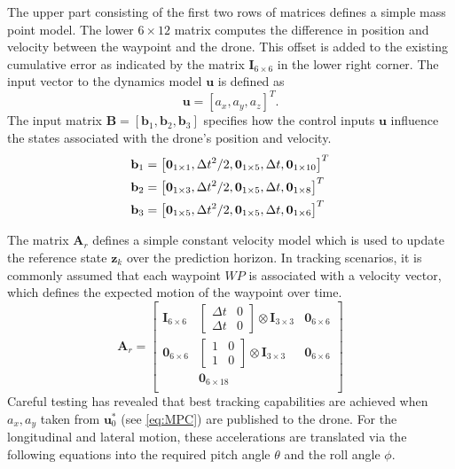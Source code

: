 The upper part consisting of the first two rows of matrices defines a simple mass point model. The lower $6\times12$ matrix computes the difference in position and velocity between the waypoint and the drone. This offset is added to the existing cumulative error as indicated by the matrix $\mathbf{I}_{6\times6}$ in the lower right corner. 
The input vector to the dynamics model $\mathbf{u}$  is defined as
\begin{dmath}
\mathbf{u} = \left[a_x,a_y,a_z\right]^T.
\end{dmath}
The input matrix $\mathbf{B} = \left[ \mathbf{b}_1,\mathbf{b}_2, \mathbf{b}_3 \right]$  specifies how the control inputs $\mathbf{u}$ influence the states associated with the drone's position and velocity.
\begin{align}
\mathbf{b}_1 & = \left[\mathbf{0}_{1\times1},\Delta t^2/2 , \mathbf{0}_{1\times5},\Delta t ,\mathbf{0}_{1\times10} \right]^T \notag   \\ 
\mathbf{b}_2 & = \left[\mathbf{0}_{1\times3},\Delta t^2/2 , \mathbf{0}_{1\times5},\Delta t ,\mathbf{0}_{1\times8} \right]^T\\
\mathbf{b}_3 & = \left[\mathbf{0}_{1\times5},\Delta t^2/2 , \mathbf{0}_{1\times5},\Delta t ,\mathbf{0}_{1\times6} \right]^T  \notag
\end{align}

The matrix $\mathbf{A}_{r}$ defines a simple constant velocity model which is used to update the reference state $\mathbf{z}_{k}$ over the prediction horizon. In tracking scenarios, it is commonly assumed that each waypoint $WP$ is associated with a velocity vector, which defines the expected motion of the waypoint over time.
\begin{equation}
\mathbf{A}_{r} =
\begin{bmatrix}
\mathbf{I}_{6\times6} & \begin{bmatrix} \Delta t & 0 \\ \Delta t & 0\end{bmatrix} \otimes \mathbf{I}_{3\times3} & \mathbf{0}_{6\times6} \\ 
\mathbf{0}_{6\times6} & \begin{bmatrix} 1 & 0 \\ 1 & 0\end{bmatrix} \otimes \mathbf{I}_{3\times3} & \mathbf{0}_{6\times6} \\ 
&\mathbf{0}_{6\times18}&\\
\end{bmatrix}
\end{equation}
Careful testing has revealed that best tracking capabilities are achieved when $a_{x}, a_{y}$ taken from $\mathbf{u}_0^*$ (see \eqref{eq:MPC})  are published to the drone. For the longitudinal and lateral motion, these  accelerations are translated via the following equations into the required pitch angle $\theta$ and the roll angle $\phi$.

